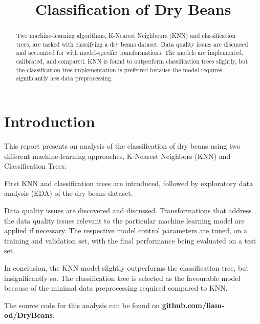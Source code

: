 \documentclass[conference]{IEEEtran}
\begin{document}
\title{Classification of Dry Beans}
\author{
}

\maketitle

\begin{abstract}
    Two machine-learning algorithms, K-Nearest Neighbours (KNN) and classification trees,
    are tasked with classifying a dry beans dataset. Data quality issues are discussed and
    accounted for with model-specific transformations. The models are implemented, calibrated, and
    compared. KNN is found to outperform classification trees slightly, but the classification tree
    implementation is preferred because the model requires significantly less data preprocessing.
\end{abstract}

\section{Introduction}

This report presents an analysis of the classification of dry beans using two different machine-learning approaches,
K-Nearest Neighbors (KNN) and Classification Trees.

First KNN and classification trees are introduced, followed by exploratory data analysis (EDA) of the dry beans
dataset.

Data quality issues are discovered and discussed. Transformations that address the data quality issues relevant
to the particular machine learning model are applied if necessary. The respective model control parameters are tuned,
on a training and validation set, with the final performance being evaluated on a test set.

In conclusion, the KNN model slightly outperforms the classification tree, but insignificantly so. The classification tree
is selected as the favourable model because of the minimal data preprocessing required compared to KNN.

The source code for this analysis can be found on \textbf{github.com/liam-od/DryBeans}.
\end{document}

